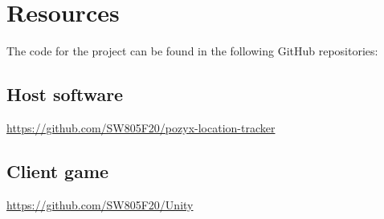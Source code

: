 \chapter*{Resources}
The code for the project can be found in the following GitHub repositories:

\section*{Host software}
\hyperlink{https://github.com/SW805F20/pozyx-location-tracker}{https://github.com/SW805F20/pozyx-location-tracker}

\section*{Client game}
\hyperlink{https://github.com/SW805F20/Unity}{https://github.com/SW805F20/Unity}
